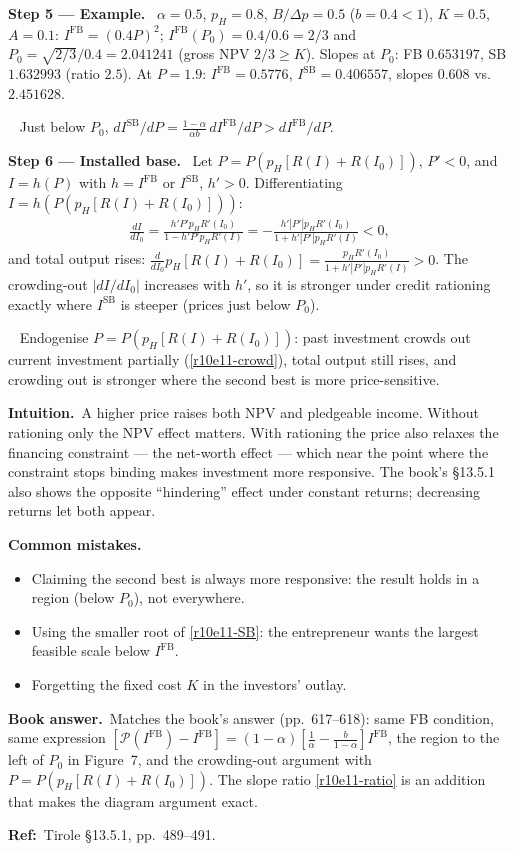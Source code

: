 \documentclass[11pt,a4paper]{article}
\newcommand{\step}[2]{\par\medskip\noindent\textbf{Step #1 --- #2.}~}
\newcommand{\intuition}{\par\medskip\noindent\textbf{Intuition.}~}
\newcommand{\bookans}{\par\medskip\noindent\textbf{Book answer.}~}
\newcommand{\refbib}{\par\smallskip\noindent\textbf{Ref:}~}
\newcommand{\answer}[1]{\par\smallskip\noindent\fbox{\textbf{Answer\if\relax\detokenize{#1}\relax\else\ #1\fi.}}~}
\newcommand{\pitfalls}{\par\medskip\noindent\textbf{Common mistakes.}}
\newcommand{\Pc}{\mathcal{P}}
\begin{document}
\step{5}{Example} $\alpha=0.5$, $p_H=0.8$, $B/\Delta p=0.5$ ($b=0.4<1$), $K=0.5$, $A=0.1$: $I^{\text{FB}}=(0.4P)^2$; $I^{\text{FB}}(P_0)=0.4/0.6=2/3$ and $P_0=\sqrt{2/3}/0.4=2.041241$ (gross NPV $2/3\geq K$). Slopes at $P_0$: FB $0.653197$, SB $1.632993$ (ratio $2.5$). At $P=1.9$: $I^{\text{FB}}=0.5776$, $I^{\text{SB}}=0.406557$, slopes $0.608$ vs.\ $2.451628$.

\answer{(ii)} Just below $P_0$, $dI^{\text{SB}}/dP=\frac{1-\alpha}{\alpha b}\,dI^{\text{FB}}/dP>dI^{\text{FB}}/dP$.

\step{6}{Installed base} Let $P=P(p_H[R(I)+R(I_0)])$, $P'<0$, and $I=h(P)$ with $h=I^{\text{FB}}$ or $I^{\text{SB}}$, $h'>0$. Differentiating $I=h(P(p_H[R(I)+R(I_0)]))$:
\begin{align}
  \frac{dI}{dI_0} = \frac{h'P'p_HR'(I_0)}{1-h'P'p_HR'(I)} = -\frac{h'|P'|p_HR'(I_0)}{1+h'|P'|p_HR'(I)}<0, \label{r10e11-crowd}
\end{align}
and total output rises: $\frac{d}{dI_0}p_H[R(I)+R(I_0)]=\frac{p_HR'(I_0)}{1+h'|P'|p_HR'(I)}>0$. The crowding-out $|dI/dI_0|$ increases with $h'$, so it is stronger under credit rationing exactly where $I^{\text{SB}}$ is steeper (prices just below $P_0$).

\answer{(iii)} Endogenise $P=P(p_H[R(I)+R(I_0)])$: past investment crowds out current investment partially (\eqref{r10e11-crowd}), total output still rises, and crowding out is stronger where the second best is more price-sensitive.

\intuition A higher price raises both NPV and pledgeable income. Without rationing only the NPV effect matters. With rationing the price also relaxes the financing constraint --- the net-worth effect --- which near the point where the constraint stops binding makes investment more responsive. The book's \S13.5.1 also shows the opposite ``hindering'' effect under constant returns; decreasing returns let both appear.

\pitfalls
\begin{itemize}
  \item Claiming the second best is always more responsive: the result holds in a region (below $P_0$), not everywhere.
  \item Using the smaller root of \eqref{r10e11-SB}: the entrepreneur wants the largest feasible scale below $I^{\text{FB}}$.
  \item Forgetting the fixed cost $K$ in the investors' outlay.
\end{itemize}

\bookans Matches the book's answer (pp.~617--618): same FB condition, same expression $[\Pc(I^{\text{FB}})-I^{\text{FB}}]=(1-\alpha)[\frac1\alpha-\frac{b}{1-\alpha}]I^{\text{FB}}$, the region to the left of $P_0$ in Figure~7, and the crowding-out argument with $P=P(p_H[R(I)+R(I_0)])$. The slope ratio \eqref{r10e11-ratio} is an addition that makes the diagram argument exact.
\refbib{Tirole \S13.5.1, pp.~489--491.}
\end{document}

